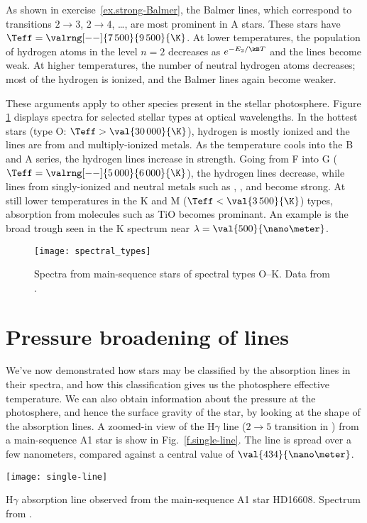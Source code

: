 As shown in exercise~\ref{ex.strong-Balmer}, the Balmer lines, which correspond to transitions $2\to3$, $2\to 4$, \ldots, are most prominent in A stars. These stars have $\Teff = \valrng[--]{7\,500}{9\,500}{\K}$. At lower temperatures, the population of hydrogen atoms in the level $n=2$ decreases as $e^{-E_{2}/\kB T}$ and the lines become weak. At higher temperatures, the number of neutral hydrogen atoms decreases; most of the hydrogen is ionized, and the Balmer lines again become weaker.

These arguments apply to other species present in the stellar photosphere. Figure \ref{f.spectral-types} displays spectra for selected stellar types at optical wavelengths. In the hottest stars (type O: $\Teff > \val{30\,000}{\K}$), hydrogen is mostly ionized and the lines are from  and multiply-ionized metals. As the temperature cools into the B and A series, the hydrogen lines increase in strength. Going from F into G ($\Teff = \valrng[--]{5\,000}{6\,000}{\K}$), the hydrogen lines decrease, while lines from singly-ionized and neutral metals such as , , and  become strong.  At still lower temperatures in the K and M ($\Teff < \val{3\,500}{\K}$) types, absorption from molecules such as TiO becomes prominant.  An example is the broad trough seen in the K spectrum near $\lambda = \val{500}{\nano\meter}$.

\begin{figure}[hbp]
\texttt{[image: spectral\_types]}
\caption[Standard stellar types]{\label{f.spectral-types} Spectra from main-sequence stars of spectral types O--K. Data from \protect\citet{Jacoby1984A-library-of-st}.}
\end{figure}

\section{Pressure broadening of lines}

We've now demonstrated how stars may be classified by the absorption lines in their spectra, and how this classification gives us the photosphere effective temperature. We can also obtain information about the pressure at the photosphere, and hence the surface gravity of the star, by looking at the shape of the absorption lines. A zoomed-in view of the H$\gamma$ line ($2\to5$ transition in ) from a main-sequence A1 star is show in Fig.~\ref{f.single-line}. The line is spread over a few nanometers, compared against a central value of $\val{434}{\nano\meter}$.
\begin{marginfigure}[-8\baselineskip]
\texttt{[image: single-line]}
\caption[H$\gamma$ absorption line]{\label{f.single-line} H$\gamma$ absorption line observed from the main-sequence A1 star HD16608. Spectrum from \protect\citet{Jacoby1984A-library-of-st}.}
\end{marginfigure}

